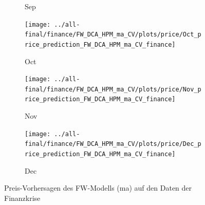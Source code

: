 \documentclass[ngerman]{ttlab-qualify}
\begin{document}
\begin{figure}[H]
\begin{subfigure}{.3\linewidth}
  \caption{Sep}
  \end{subfigure}\par\medskip
  \begin{subfigure}{.3\linewidth}
  \texttt{[image: ../all-final/finance/FW\_DCA\_HPM\_ma\_CV/plots/price/Oct\_price\_prediction\_FW\_DCA\_HPM\_ma\_CV\_finance]}\hfill
  \caption{Oct}
  \end{subfigure}
  \begin{subfigure}{.3\linewidth}
  \texttt{[image: ../all-final/finance/FW\_DCA\_HPM\_ma\_CV/plots/price/Nov\_price\_prediction\_FW\_DCA\_HPM\_ma\_CV\_finance]}\hfill
  \caption{Nov}
  \end{subfigure}
  \begin{subfigure}{.3\linewidth}
  \texttt{[image: ../all-final/finance/FW\_DCA\_HPM\_ma\_CV/plots/price/Dec\_price\_prediction\_FW\_DCA\_HPM\_ma\_CV\_finance]}\hfill
  \caption{Dec}
  \end{subfigure}
  \caption{Preis-Vorhersagen des FW-Modells (ma) auf den Daten der Finanzkrise}
\end{figure}
\end{document}
